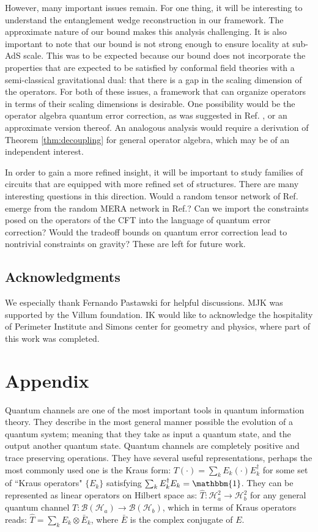 \documentclass[a4paper,11pt]{article}
\newcommand{\1}{\mathbbm{1}}
\newcommand{\cH}{\mathcal{H}}
\newcommand{\cB}{\mathcal{B}}
\begin{document}
However, many important issues remain. For one thing, it will be interesting to understand the entanglement wedge reconstruction\cite{Almheiri2014} in our framework. The approximate nature of our bound makes this analysis challenging.
It is also important to note that our bound is not strong enough to ensure locality at sub-AdS scale. This was to be expected because our bound does not incorporate the properties that are expected to be satisfied by conformal field theories with a semi-classical gravitational dual: that there is a gap in the scaling dimension of the operators.\cite{Heemskerk2009} For both of these issues, a framework that can organize operators in terms of their scaling dimensions is desirable. One possibility would be the operator algebra quantum error correction, as was suggested in Ref. \cite{Almheiri2014}, or an approximate version thereof. An analogous analysis would require a derivation of Theorem \ref{thm:decoupling} for general operator algebra, which may be of an independent interest.


In order to gain a more refined insight, it will be important to study families of circuits that are equipped with more refined set of structures. There are many interesting questions in this direction.
Would a random tensor network of Ref.\cite{Hayden2016} emerge from the random MERA network in Ref.\cite{Swingle2012a}? Can we import the constraints posed on the operators of the CFT into the language
of quantum error correction? Would the tradeoff bounds on quantum error correction lead to nontrivial constraints on gravity? These are left for future work.

\subsection*{Acknowledgments}
We especially thank Fernando Pastawski for helpful discussions. MJK was supported by the Villum foundation. IK would like to acknowledge the hospitality of Perimeter Institute and Simons center for geometry and physics, where part of this work was completed.







\section{Appendix}

Quantum channels are one of the most important tools in quantum information theory. They describe in the most general manner possible the evolution of a quantum system; meaning that they take as input a quantum state, and the output another quantum state. Quantum channels are completely positive and trace preserving operations. They have several useful representations, perhaps the most commonly used one is the Kraus form: $T(\cdot)=\sum_k E_k (\cdot)E_k^\dag$ for some set of ``Kraus operators" $\{E_k\}$ satisfying $\sum_k E_k^\dag E_k=\1$.  They can be represented as linear operators on Hilbert space as: $\hat{T}:\cH^2_a\rightarrow\cH^2_b$ for any general quantum channel $T:\cB(\cH_a)\rightarrow \cB(\cH_b)$, which in terms of Kraus operators reads:  $\hat{T}=\sum_k E_k\otimes \bar{E}_k$, where $\bar{E}$ is the complex conjugate of $E$.
\end{document}
